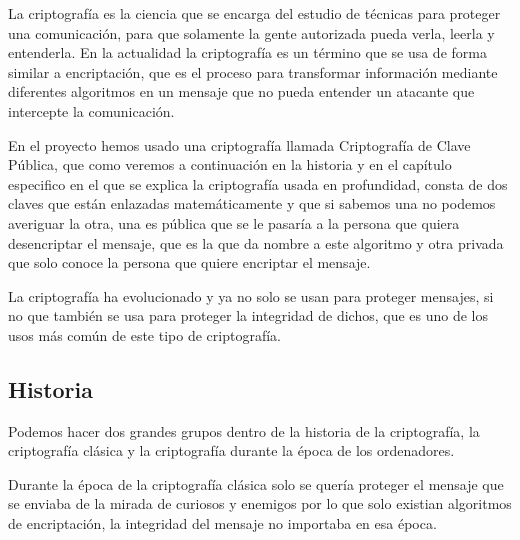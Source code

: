 La criptografía es la ciencia que se encarga del estudio de técnicas para proteger una comunicación, para que solamente la gente autorizada pueda verla, leerla y entenderla. En la actualidad la criptografía es un término que se usa de forma similar a encriptación, que es el proceso para transformar información mediante diferentes algoritmos en un mensaje que no pueda entender un atacante que intercepte la comunicación. 


En el proyecto hemos usado una criptografía llamada Criptografía de Clave Pública, que como veremos a continuación en la historia y en el capítulo especifico en el que se explica la criptografía usada en profundidad, consta de dos claves que están enlazadas matemáticamente y que si sabemos una no podemos averiguar la otra, una es pública que se le pasaría a la persona que quiera desencriptar el mensaje, que es la que da nombre a este algoritmo y otra privada que solo conoce la persona que quiere encriptar el mensaje.

La criptografía ha evolucionado y ya no solo se usan para proteger mensajes, si no que también se usa para proteger la integridad de dichos, que es uno de los usos más común de este tipo de criptografía.

\subsection{Historia}

Podemos hacer dos grandes grupos dentro de la historia de la criptografía, la criptografía clásica y la criptografía durante la época de los ordenadores.

	Durante la época de la criptografía clásica solo se quería proteger el mensaje que se enviaba de la mirada de curiosos y enemigos por lo que solo existian algoritmos de encriptación, la integridad del mensaje no importaba en esa época.  
	
